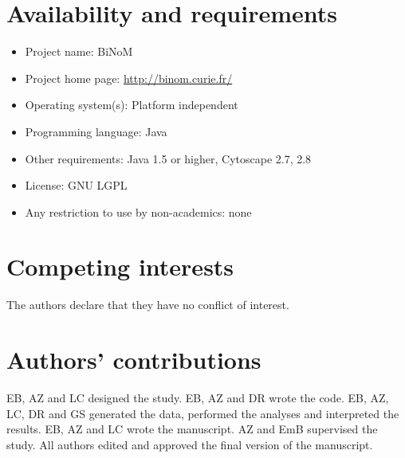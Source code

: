 \documentclass[11pt]{bmc_article_s50}
\newenvironment{bmcformat}{\begin{raggedright}\baselineskip20pt\sloppy\setboolean{publ}{false}}{\end{raggedright}\baselineskip20pt\sloppy}
\begin{document}
\begin{bmcformat}
\section*{Availability and requirements}

\begin{itemize}
\item Project name: BiNoM
\item Project home page: \url{http://binom.curie.fr/}
\item Operating system(s): Platform independent
\item Programming language: Java
\item Other requirements: Java 1.5 or higher, Cytoscape 2.7, 2.8
\item License: GNU LGPL
\item Any restriction to use by non-academics: none
\end{itemize}






\section*{Competing interests}
The authors declare that they have no conflict of interest.

\section*{Authors' contributions}
EB, AZ and LC designed the study. EB, AZ and DR wrote the code. EB, AZ, LC, DR
and GS generated the data, performed the analyses and interpreted the results.
EB, AZ and LC wrote the manuscript. AZ and EmB supervised the study. All authors
edited and approved the final version of the manuscript.


\end{bmcformat}
\end{document}
